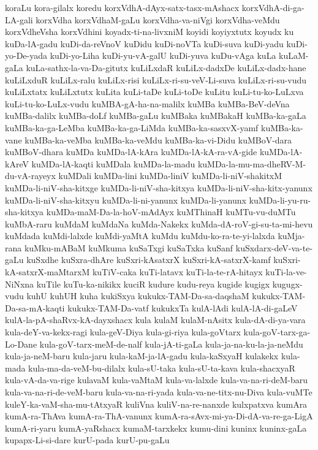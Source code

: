 {koraLu
kora-gilalx
koredu
korxVdhA-dAyx-satx-tasx-mAshacx
korxVdhA-di-ga-LA-gali
korxVdha
korxVdhaM-gaLu
korxVdha-va-niVgi
korxVdha-veMdu
korxVdheVsha
korxVdhini
koyadx-ti-na-livxniM
koyidi
koyiyxtutx
koyudx
ku
kuDa-lA-gadu
kuDi-da-reVnoV
kuDidu
kuDi-noVTa
kuDi-suva
kuDi-yadu
kuDi-yo-De-yada
kuDi-yo-Liha
kuDi-yu-vA-galU
kuDi-yuva
kuDu-vAga
kuLa
kuLaM-gaLa
kuLa-sathx-la-va-Da-gitutx
kuLiLxdaR
kuLiLx-dadxDe
kuLiLx-dadx-hane
kuLiLxduR
kuLiLx-ralu
kuLiLx-risi
kuLiLx-ri-su-veV-Li-suva
kuLiLx-ri-su-vudu
kuLiLxtatx
kuLiLxtutx
kuLita
kuLi-taDe
kuLi-toDe
kuLitu
kuLi-tu-ko-LuLxva
kuLi-tu-ko-LuLx-vudu
kuMBA-gA-ha-na-malilx
kuMBa
kuMBa-BeV-deVna
kuMBa-dalilx
kuMBa-doLf
kuMBa-gaLu
kuMBaka
kuMBakaH
kuMBa-ka-gaLa
kuMBa-ka-ga-LeMba
kuMBa-ka-ga-LiMda
kuMBa-ka-sasxvX-yamf
kuMBa-ka-vane
kuMBa-ka-veMba
kuMBa-ka-veMdu
kuMBa-ka-vi-Didu
kuMBoV-dara
kuMBoV-dhara
kuMDa
kuMDa-lA-kAra
kuMDa-lA-kA-ra-vA-gide
kuMDa-lA-kAreV
kuMDa-lA-kaqti
kuMDala
kuMDa-la-madu
kuMDa-la-mu-ma-dheRV-M-du-vA-rayeyx
kuMDali
kuMDa-lini
kuMDa-liniV
kuMDa-li-niV-shakitxM
kuMDa-li-niV-sha-kitxge
kuMDa-li-niV-sha-kitxya
kuMDa-li-niV-sha-kitx-yanunx
kuMDa-li-niV-sha-kitxyu
kuMDa-li-ni-yanunx
kuMDa-li-yanunx
kuMDa-li-yu-ru-sha-kitxya
kuMDa-maM-Da-la-hoV-mAdAyx
kuMThinaH
kuMTu-vu-duMTu
kuMbA-raru
kuMdaM
kuMdaNa
kuMda-Nakekx
kuMda-dA-roV-gi-su-ta-mi-hevu
kuMdada
kuMdi-lalxde
kuMdi-yaMtA
kuMdu
kuMdu-ko-ra-te-yi-lalxda
kuMja-rana
kuMku-mABaM
kuMkuma
kuSaTxgi
kuSaTxka
kuSanf
kuSxdarx-deV-va-te-gaLu
kuSxdhe
kuSxra-dhAre
kuSxri-kAsatxrX
kuSxri-kA-satxrX-kamf
kuSxri-kA-satxrX-maMtarxM
kuTiV-caka
kuTi-latavx
kuTi-la-te-rA-hitayx
kuTi-la-ve-NiNxna
kuTile
kuTu-ka-nikikx
kuciR
kudure
kudu-reya
kugide
kugigx
kugugx-vudu
kuhU
kuhUH
kuha
kukiSxya
kukukx-TAM-Da-sa-daqshaM
kukukx-TAM-Da-sa-mA-kaqti
kukukx-TAM-Da-vatf
kukukxTa
kulA-lAdi
kulA-lA-di-gaLeV
kulA-la-pA-shaRvx-kA-dayxshacx
kula
kulaM
kulaM-nAsitx
kula-dA-di-ya-vara
kula-deY-va-kekx-ragi
kula-geV-Diya
kula-gi-riya
kula-goVtarx
kula-goV-tarx-ga-Lo-Dane
kula-goV-tarx-meM-de-nalf
kula-jA-ti-gaLa
kula-ja-na-ku-la-ja-neMdu
kula-ja-neM-baru
kula-jaru
kula-kaM-ja-lA-gadu
kula-kaSxyaH
kulakekx
kula-mada
kula-ma-da-veM-bu-dilalx
kula-sU-taka
kula-sU-ta-kava
kula-shacxyaR
kula-vA-da-va-rige
kulavaM
kula-vaMtaM
kula-va-lalxde
kula-va-na-ri-deM-baru
kula-va-na-ri-de-veM-baru
kula-va-na-ri-yada
kula-va-ne-titx-nu-Diva
kula-vuMTe
kuleY-ka-vaM-sha-mu-tAtxyaR
kuliVna
kuliV-na-re-nanxde
kulxpatxva
kumAra
kumA-ra-ThAva
kumA-ra-ThA-vanunx
kumA-ra-sAvx-mi-ya-Di-dA-va-re-ga-LigA
kumA-ri-yaru
kumA-yaRshacx
kumaM-tarxkekx
kumu-dini
kuninx
kuninx-gaLa
kupapx-Li-si-dare
kurU-pada
kurU-pu-gaLu
}
